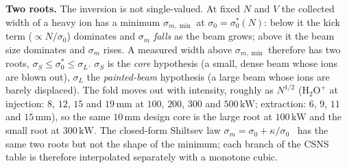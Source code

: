 \documentclass[hyperref]{cernrep}
\begin{document}
\medskip\noindent\textbf{Two roots.}
The inversion is not single-valued. At fixed $N$ and $V$ the collected
width of a heavy ion has a minimum $\sigma_{m,\min}$ at
$\sigma_0=\sigma_0^*(N)$: below it the kick term ($\propto N/\sigma_0$)
dominates and $\sigma_m$ \emph{falls} as the beam grows; above it the
beam size dominates and $\sigma_m$ rises. A measured width above
$\sigma_{m,\min}$ therefore has two roots,
$\sigma_S\le\sigma_0^*\le\sigma_L$. $\sigma_S$ is the \emph{core}
hypothesis (a small, dense beam whose ions are blown out), $\sigma_L$
the \emph{painted-beam} hypothesis (a large beam whose ions are barely
displaced). The fold moves out with intensity, roughly as $N^{1/2}$
($\mathrm{H}_2\mathrm{O}^+$ at injection: $8$, $12$, $15$ and
$19\,\mathrm{mm}$ at $100$, $200$, $300$ and $500\,\mathrm{kW}$;
extraction: $6$, $9$, $11$ and $15\,\mathrm{mm}$), so the same
$10\,\mathrm{mm}$ design core is the large root at $100\,\mathrm{kW}$
and the small root at $300\,\mathrm{kW}$. The closed-form Shiltsev law
$\sigma_m=\sigma_0+\kappa/\sigma_0$~\cite{Shiltsev2021} has the same
two roots but not the shape of the minimum; each branch of the CSNS
table is therefore interpolated separately with a monotone cubic.
\end{document}
